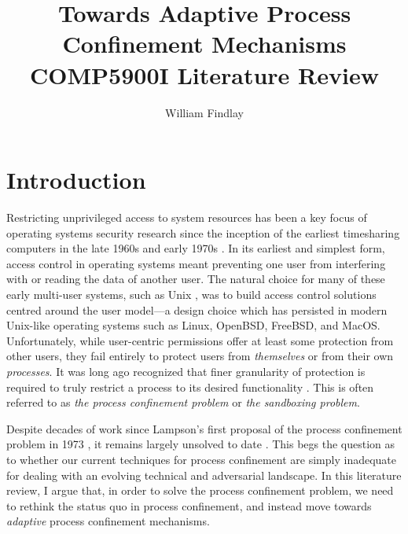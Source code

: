 \documentclass[dvipsnames, 12pt]{article}
\title{\huge Towards Adaptive Process Confinement
Mechanisms\\{\large COMP5900I Literature Review}}
\author{William Findlay}
\begin{document}
\maketitle
\thispagestyle{empty}


\vfill
\begin{abstract}
\end{abstract}
\vfill
\vfill

\clearpage

\setcounter{page}{1}

\onehalfspacing

\section{Introduction}
\label{sec:introduction}

Restricting unprivileged access to system resources has been a key focus of
operating systems security research since the inception of the earliest
timesharing computers in the late 1960s and early 1970s
\cite{graham1968_protection, ritchie1973_unix, corbato1962_ctss}. In its
earliest and simplest form, access control in operating systems meant preventing
one user from interfering with or reading the data of another user. The natural
choice for many of these early multi-user systems, such as Unix
\cite{ritchie1973_unix}, was to build access control solutions centred around
the user model---a design choice which has persisted in modern Unix-like
operating systems such as Linux, OpenBSD, FreeBSD, and MacOS.  Unfortunately,
while user-centric permissions offer at least some protection from other users,
they fail entirely to protect users from \textit{themselves} or from their own
\textit{processes}.  It was long ago recognized that finer granularity of
protection is required to truly restrict a process to its desired functionality
\cite{lampson1973_a_note}. This is often referred to as \textit{the process
confinement problem} or \textit{the sandboxing problem}.

Despite decades of work since Lampson's first proposal of the process
confinement problem in 1973 \cite{lampson1973_a_note}, it remains largely
unsolved to date \cite{crowell2013_confinement_problem}. This begs the question
as to whether our current techniques for process confinement are simply
inadequate for dealing with an evolving technical and adversarial landscape.  In
this literature review, I argue that, in order to solve the process confinement
problem, we need to rethink the status quo in process confinement, and instead
move towards \textit{adaptive} process confinement mechanisms.
\end{document}
